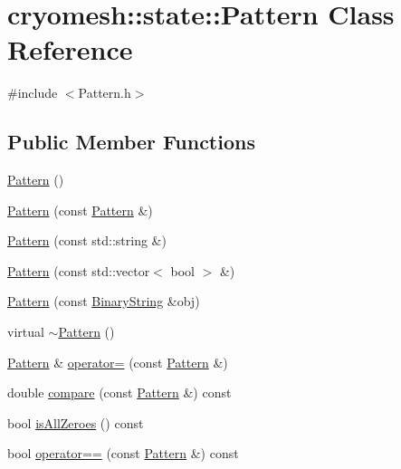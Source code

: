 \hypertarget{classcryomesh_1_1state_1_1Pattern}{\section{cryomesh\-:\-:state\-:\-:\-Pattern \-Class \-Reference}
\label{classcryomesh_1_1state_1_1Pattern}
}


{\ttfamily \#include $<$\-Pattern.\-h$>$}

\subsection*{\-Public \-Member \-Functions}
\begin{DoxyCompactItemize}
\item 
\hyperlink{classcryomesh_1_1state_1_1Pattern_a5e9e2738edae7cd79164b834e1cdee6c}{\-Pattern} ()
\item 
\hyperlink{classcryomesh_1_1state_1_1Pattern_a40fda07d27a5ced7e527fbd48d3e908c}{\-Pattern} (const \hyperlink{classcryomesh_1_1state_1_1Pattern}{\-Pattern} \&)
\item 
\hyperlink{classcryomesh_1_1state_1_1Pattern_a2c4fa08b8a29111c2c3d037d5ef294a5}{\-Pattern} (const std\-::string \&)
\item 
\hyperlink{classcryomesh_1_1state_1_1Pattern_ad90e47bde0cc1163799853af58a3558c}{\-Pattern} (const std\-::vector$<$ bool $>$ \&)
\item 
\hyperlink{classcryomesh_1_1state_1_1Pattern_a8a1d2344caa2e6b15465a0e6b50c78ab}{\-Pattern} (const \hyperlink{classcryomesh_1_1state_1_1BinaryString}{\-Binary\-String} \&obj)
\item 
virtual \hyperlink{classcryomesh_1_1state_1_1Pattern_a6fd2a03ab3ee83afb5925b5eca5475e2}{$\sim$\-Pattern} ()
\item 
\hyperlink{classcryomesh_1_1state_1_1Pattern}{\-Pattern} \& \hyperlink{classcryomesh_1_1state_1_1Pattern_ae160b228aff3b4bcc49792588b2fbee6}{operator=} (const \hyperlink{classcryomesh_1_1state_1_1Pattern}{\-Pattern} \&)
\item 
double \hyperlink{classcryomesh_1_1state_1_1Pattern_ad6f8afd23c5eaeb585d5690496d81c05}{compare} (const \hyperlink{classcryomesh_1_1state_1_1Pattern}{\-Pattern} \&) const 
\item 
bool \hyperlink{classcryomesh_1_1state_1_1Pattern_a8dc6809b00c16358f993ac7e774d130a}{is\-All\-Zeroes} () const 
\item 
bool \hyperlink{classcryomesh_1_1state_1_1Pattern_a4a9f45cfa7eec822e011b49036436369}{operator==} (const \hyperlink{classcryomesh_1_1state_1_1Pattern}{\-Pattern} \&) const 

\end{DoxyCompactItemize}
